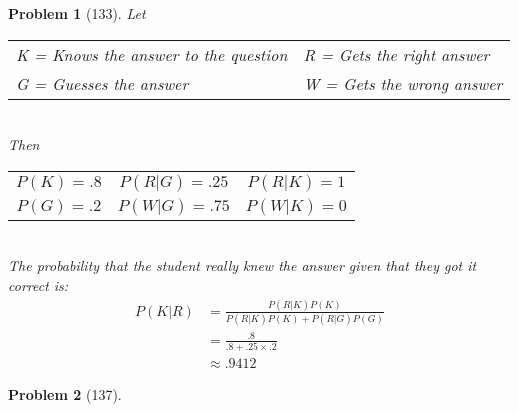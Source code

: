 \documentclass{article}
\theoremstyle{problem}
\newtheorem{prob}{Problem}
\begin{document}
\begin{prob}[133]
Let
\begin{tabular}{l l}
K = Knows the answer to the question & R = Gets the right answer \\ 
G = Guesses the answer               & W = Gets the wrong answer
\end{tabular}\\[.3cm]
Then
\begin{tabular}{c c c}
$P(K) = .8$ & $P(R|G) = .25$ & $P(R|K) = 1$\\
$P(G) = .2$ & $P(W|G) = .75$ & $P(W|K) = 0$
\end{tabular}\\[.3cm]
The probability that the student really knew the answer given that they got it correct is:
\begin{align*}
P(K|R) &= \frac{P(R|K)P(K)}{P(R|K)P(K) + P(R|G)P(G)}\\
       &= \frac{.8}{.8 + .25 \times .2}\\
       &\approx .9412
\end{align*}
\end{prob}

\begin{prob}[137]

\end{prob}
\end{document}

